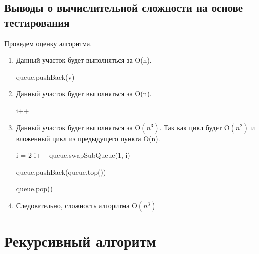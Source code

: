 \subsection{Выводы о вычислительной сложности на основе тестирования}
Проведем оценку алгоритма.
\begin{enumerate}
    \item Данный участок будет выполняться за O(n).
    \begin{algorithmic}
            \State queue.pushBack(v)
        \EndFor
    \end{algorithmic}

    \item Данный участок будет выполняться за O(n).
    \begin{algorithmic}
            \State i++
        \EndWhile
    \end{algorithmic}

    \item Данный участок будет выполняться за O$(n^3)$. Так как цикл будет O$(n^2)$ и вложенный цикл из предыдущего пункта O(n).
    \begin{algorithmic}

                \State i = 2
                \State  {}
                        \State i++
                        \EndWhile
                \State queue.swapSubQueue(1, i)
            \EndIf

            queue.pushBack(queue.top())

            queue.pop()
        \EndFor
    \end{algorithmic}

    \item Следовательно, сложность алгоритма O$(n^3)$

\end{enumerate}

\newpage

\section{Рекурсивный алгоритм}

